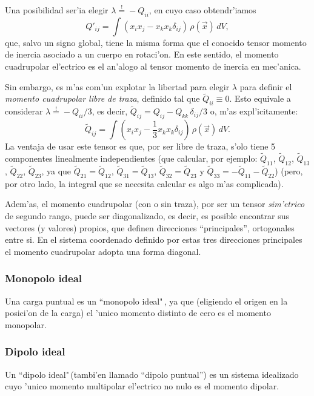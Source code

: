 Una posibilidad ser'ia elegir $\lambda\stackrel{!}{=}-Q_{ii}$, en cuyo caso obtendr'iamos
\begin{equation}
 \boxed{Q'_{ij}=\int
(x_ix_j-x_kx_k\delta_{ij})\,\rho(\vec{x})\,dV,}
\end{equation}
que, salvo un signo global, tiene la misma forma que el conocido tensor momento de inercia asociado a un cuerpo en rotaci'on. En este sentido, el momento cuadrupolar el'ectrico es el an'alogo al tensor momento de inercia en mec'anica.

Sin embargo, es m'as com'un explotar la libertad para elegir $\lambda$ para definir el  \textit{momento cuadrupolar libre de traza}, definido tal que $\tilde{Q}_{ii}\equiv 0$. Esto equivale a considerar $\lambda\stackrel{!}{=}-Q_{ii}/3$, es decir, $\tilde{Q}_{ij}=Q_{ij}-Q_{kk}\,\delta_{ij}/3$ o,
m'as expl'icitamente:
\begin{equation}
 \boxed{\tilde{Q}_{ij}=\int
(x_ix_j-\frac{1}{3}x_kx_k\delta_{ij})\,\rho(\vec{x})\,dV.} \label{mom4st}
\end{equation}
La ventaja de usar este tensor es que, por ser libre de traza, s'olo tiene 5
componentes linealmente independientes (que calcular, por ejemplo:
$\tilde{Q}_{11}$, $\tilde{Q}_{12}$, $\tilde{Q}_{13}$, $\tilde{Q}_{22}$,
$\tilde{Q}_{23}$, ya que $\tilde{Q}_{21}=\tilde{Q}_{12}$,
$\tilde{Q}_{31}=\tilde{Q}_{13}$, $\tilde{Q}_{32}=\tilde{Q}_{23}$ y
$\tilde{Q}_{33}=-\tilde{Q}_{11}-\tilde{Q}_{22}$) (pero, por otro lado, la integral que se necesita calcular es algo m'as complicada).

Adem'as, el momento cuadrupolar (con o sin traza), por ser un tensor \textit{sim'etrico} de segundo rango, puede ser diagonalizado, es decir, es posible encontrar sus vectores (y valores) propios, que definen direcciones ``principales'', ortogonales entre si. En el sistema coordenado definido por estas tres direcciones principales el momento cuadrupolar adopta una forma diagonal.


\subsubsection{Monopolo ideal}
Una carga puntual es un ``monopolo ideal"\,, ya que (eligiendo el origen en la posici'on de la carga) el 'unico momento distinto de cero es el momento monopolar. 

\subsubsection{Dipolo ideal}
Un ``dipolo ideal"\,(tambi'en llamado ``dipolo puntual'') es un sistema idealizado cuyo 'unico momento multipolar el'ectrico no nulo es el momento dipolar.

